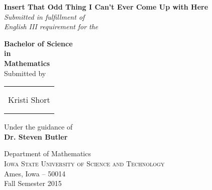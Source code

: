\begin{titlepage}

\begin{center}

\Huge \textbf {Insert That Odd Thing I Can't Ever Come Up with Here}\\[0.5in]

       \small \emph{Submitted in fulfillment of\\
        English III requirement}
		\newline
        \small \emph{for the}
		\vspace{.2in}

       {\bf Bachelor of Science \\in\\ Mathematics}\\[0.5in]

\normalsize Submitted by \\
\begin{table}[h]
\centering
\begin{tabular}{c}\hline \\
\\
Kristi Short \\ \\ \\ \hline 
\end{tabular}
\end{table}

\vspace{.1in}
Under the guidance of\\
{\textbf{Dr. Steven Butler}}\\[0.2in]

\vfill

\Large{Department of Mathematics}\\
\normalsize
\textsc{Iowa State University of Science and Technology}\\
Ames, Iowa -- 50014 \\
\vspace{0.2cm}
Fall Semester 2015

\end{center}

\end{titlepage}
